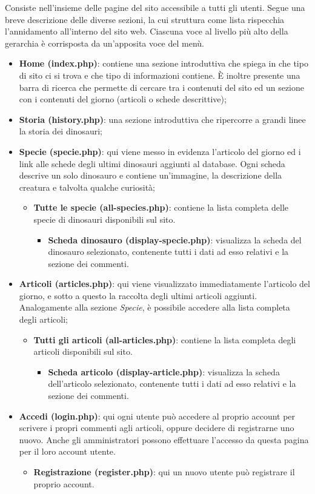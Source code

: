 \documentclass[12pt]{article}
\begin{document}
	Consiste nell'insieme delle pagine del sito accessibile a tutti gli utenti. Segue una breve descrizione delle diverse sezioni, la cui struttura come lista rispecchia l'annidamento all'interno del sito web. Ciascuna voce al livello più alto della gerarchia è corrisposta da un'apposita voce del menù.
	\begin{itemize}
		\item \textbf{Home (index.php)}: contiene una sezione introduttiva che spiega in che tipo di sito ci si trova e che tipo di informazioni contiene. È inoltre presente una barra di ricerca che permette di cercare tra i contenuti del sito ed un sezione con i contenuti del giorno (articoli o schede descrittive);
		\item \textbf{Storia (history.php)}: una sezione introduttiva che ripercorre a grandi linee la storia dei dinosauri;
		\item \textbf{Specie (specie.php)}: qui viene messo in evidenza l'articolo del giorno ed i link alle schede degli ultimi dinosauri aggiunti al database. Ogni scheda descrive un solo dinosauro e contiene un'immagine, la descrizione della creatura e talvolta qualche curiosità;
			\begin{itemize}
				\item \textbf{Tutte le specie (all-species.php)}: contiene la lista completa delle specie di dinosauri disponibili sul sito.
				\begin{itemize}
					\item \textbf{Scheda dinosauro (display-specie.php)}: visualizza la scheda del dinosauro selezionato, contenente tutti i dati ad esso relativi e la sezione dei commenti.
				\end{itemize}
			\end{itemize}
			
		\item \textbf{Articoli (articles.php)}: qui viene visualizzato immediatamente l'articolo del giorno, e sotto a questo la raccolta degli ultimi articoli aggiunti. Analogamente alla sezione \textit{Specie}, è possibile accedere alla lista completa degli articoli;
		\begin{itemize}
			\item \textbf{Tutti gli articoli (all-articles.php)}: contiene la lista completa degli articoli disponibili sul sito.
			\begin{itemize}
				\item \textbf{Scheda articolo (display-article.php)}: visualizza la scheda dell'articolo selezionato, contenente tutti i dati ad esso relativi e la sezione dei commenti.
			\end{itemize}
		\end{itemize}
		\item \textbf{Accedi (login.php)}: qui ogni utente può accedere al proprio account per scrivere i propri commenti agli articoli, oppure decidere di registrarne uno nuovo. Anche gli amministratori possono effettuare l'accesso da questa pagina per il loro account utente.
		\begin{itemize}
			\item \textbf{Registrazione (register.php)}: qui un nuovo utente può registrare il proprio account.
		\end{itemize}
		

\end{itemize}
\end{document}
